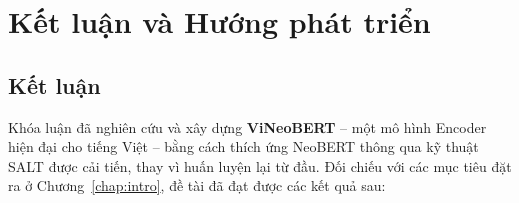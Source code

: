 \chapter{Kết luận và Hướng phát triển}
\label{chap:conclusion}

\section{Kết luận}
\label{sec:conclusion}

Khóa luận đã nghiên cứu và xây dựng \textbf{ViNeoBERT} -- một mô hình
Encoder hiện đại cho tiếng Việt -- bằng cách thích ứng NeoBERT thông qua kỹ thuật
SALT được cải tiến, thay vì huấn luyện lại từ đầu. Đối chiếu với các mục tiêu đặt ra
ở Chương~\ref{chap:intro}, đề tài đã đạt được các kết quả sau:


